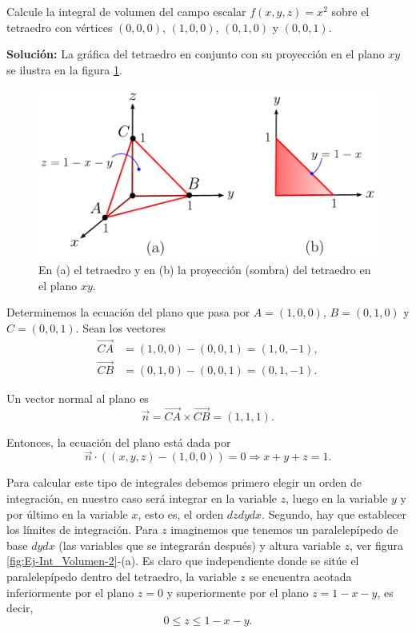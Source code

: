 \begin{ejemplo}
    Calcule la integral de volumen del campo escalar $f(x,y,z) = x^2$ sobre el tetraedro con vértices $(0,0,0)$, $(1,0,0)$, $(0,1,0)$ y $(0,0,1)$.

    \textbf{Solución:} La gráfica del tetraedro en conjunto con su proyección en el plano $xy$ se ilustra en la figura \ref{fig:Ej-Int_Volumen}.

    \begin{figure}[H]
        \centering
        \includegraphics[scale = 0.7]{Figuras/Ej-Integral-Volumen.pdf}
        \caption{En (a) el tetraedro y en (b) la proyección (sombra) del tetraedro en el plano $xy$.}
        \label{fig:Ej-Int_Volumen}
    \end{figure}

    Determinemos la ecuación del plano que pasa por $A = (1,0,0)$, $B = (0,1,0)$ y $C = (0,0,1)$. Sean los vectores
    \begin{align*}
        \overrightarrow{CA} &= (1,0,0) - (0,0,1) = (1,0,-1), \\
        \overrightarrow{CB} &= (0,1,0) - (0,0,1) = (0,1,-1).
    \end{align*}

    Un vector normal al plano es
    $$\Vec{n} = \overrightarrow{CA} \times  \overrightarrow{CB} = (1,1,1).$$

    Entonces, la ecuación del plano está dada por
    $$\Vec{n} \cdot ( (x,y,z) - (1,0,0)) = 0 \Rightarrow x + y + z = 1.$$
    
    Para calcular este tipo de integrales debemos primero elegir un orden de integración, en nuestro caso será integrar en la variable $z$, luego en la variable $y$ y por último en la variable $x$, esto es, el orden $dzdydx$. Segundo, hay que establecer los límites de integración. Para $z$ imaginemos que tenemos un paralelepípedo de base $dydx$ (las variables que se integrarán después) y altura variable $z$, ver figura \ref{fig:Ej-Int_Volumen-2}-(a). Es claro que independiente donde se sitúe el paralelepípedo dentro del tetraedro, la variable $z$ se encuentra acotada inferiormente por el plano $z = 0$ y superiormente por el plano $z = 1 - x -y$, es decir,
    $$0 \leq z \leq 1-x-y.$$


\end{ejemplo}
